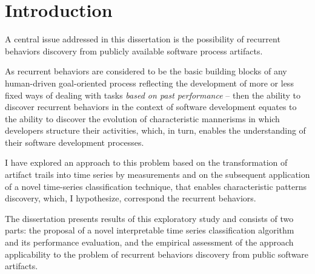 \chapter{Introduction}\label{chapter_introduction}
A central issue addressed in this dissertation is the possibility of recurrent behaviors discovery 
from publicly available software process artifacts. 

As recurrent behaviors are considered to be the basic building blocks of any human-driven
goal-oriented process reflecting the development of more or less fixed ways of dealing 
with tasks \textit{based on past performance} \cite{neal2012habits} \cite{1903} -- then
the ability to discover recurrent behaviors in the context of software development equates 
to the ability to discover the evolution of characteristic mannerisms in which developers 
structure their activities, which, in turn, enables the understanding of their software 
development processes. 

I have explored an approach to this problem based on 
the transformation of artifact trails into time series by measurements and 
on the subsequent application of a novel time-series classification technique,
that enables characteristic patterns discovery, which, 
I hypothesize, correspond the recurrent behaviors.

The dissertation presents results of this exploratory study and consists of two parts: 
the proposal of a novel interpretable time series classification algorithm and its 
performance evaluation, and the empirical assessment of the approach applicability to the 
problem of recurrent behaviors discovery from public software artifacts.



